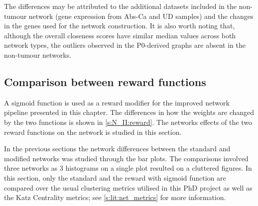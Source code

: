 The differences may be attributed to the additional datasets included in the non-tumour network (gene expression from Abs-Ca and UD samples) and the changes in the genes used for the network construction. It is also worth noting that, although the overall closeness scores have similar median values across both network types, the outliers observed in the P0-derived graphs are absent in the non-tumour networks.


\subsection{Comparison between reward functions} \label{s:N_II:reward_comp}

A sigmoid function is used as a reward modifier for the improved network pipeline presented in this chapter. The differences in how the weights are changed by the two functions is shown in \cref{s:N_II:reward}. The networks effects of the two reward functions on the network is studied in this section.

In the previous sections the network differences between the standard and modified networks was studied through the bar plots. The comparisons involved three networks as 3 histograms on a single plot resulted on a cluttered figures. In this section, only the standard and the reward with sigmoid function are compared over the usual clustering metrics utilised in this PhD project as well as the Katz Centrality metrics; see \cref{s:lit:net_metrics} for more information.


